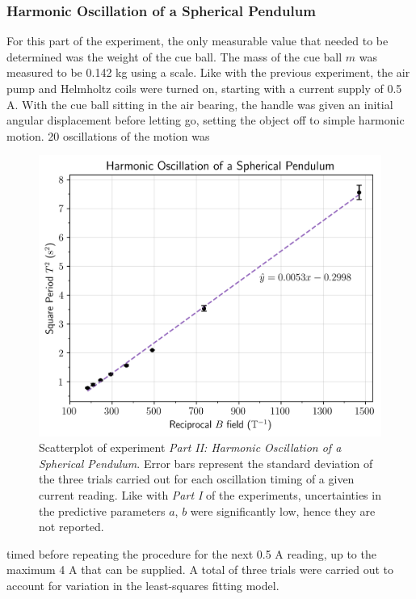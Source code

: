 \documentclass[12pt]{article}
\begin{document}
\begin{multicols}{2}
\subsubsection{Harmonic Oscillation of a Spherical
Pendulum}
For this part of the experiment, the only measurable value that needed to be determined was the weight of the cue ball.
The mass of the cue ball $m$ was measured to be 0.142 kg using a scale.
Like with the previous experiment, the air pump and Helmholtz coils were turned on,
starting with a current supply of 0.5 A.
With the cue ball sitting in the air bearing,
the handle was given an initial angular displacement before letting go,
setting the object off to simple harmonic motion.
20 oscillations of the motion was
\begin{figure}[H]
    \centering
    \includegraphics[width=0.98\linewidth]{figs/graph2.png}
    \caption{
        Scatterplot of experiment \textit{Part II: Harmonic Oscillation of a Spherical
        Pendulum}. Error bars represent the standard deviation of the three trials carried out for each
        oscillation timing of a given current reading.
        Like with \textit{Part I} of the experiments,
        uncertainties in the predictive parameters $a$, $b$ were
        significantly low, hence they are not reported.
    }
\end{figure}
\noindent
timed before repeating the procedure for the next 0.5 A reading,
up to the maximum 4 A that can be supplied. 
A total of three trials were carried out to account for variation in the least-squares fitting model.


\end{multicols}
\end{document}
